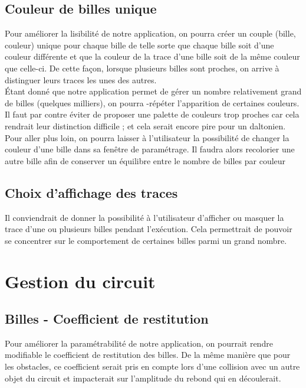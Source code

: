 \documentclass{report}
\begin{document}
\newpage
\subsection{Couleur de billes unique}

Pour améliorer la lisibilité de notre application, on pourra créer un couple (bille, couleur) unique pour chaque bille de telle sorte que chaque bille soit d’une couleur différente et que la couleur de la trace d’une bille soit de la même couleur que celle-ci. De cette façon, lorsque plusieurs billes sont proches, on arrive à distinguer leurs traces les unes des autres. \\

Étant donné que notre application permet de gérer un nombre relativement grand de billes (quelques milliers), on pourra -répéter l’apparition de certaines couleurs. Il faut par contre éviter de proposer une palette de couleurs trop proches car cela rendrait leur distinction difficile ; et cela serait encore pire pour un daltonien. \\

Pour aller plus loin, on pourra laisser à l’utilisateur la possibilité de changer la couleur d’une bille dans sa fenêtre de paramétrage. Il faudra alors recolorier une autre bille afin de conserver un équilibre entre le nombre de billes par couleur


\subsection{Choix d'affichage des traces}

Il conviendrait de donner la possibilité à l’utilisateur d’afficher ou masquer la trace d’une ou plusieurs billes pendant l’exécution. Cela permettrait de pouvoir se concentrer sur le comportement de certaines billes parmi un grand nombre.

\section{Gestion du circuit}

\subsection{Billes - Coefficient de restitution}

Pour améliorer la paramétrabilité de notre application, on pourrait rendre modifiable le coefficient de restitution des billes. De la même manière que pour les obstacles, ce coefficient serait pris en compte lors d’une collision avec un autre objet du circuit et impacterait sur l’amplitude du rebond qui en découlerait.
\end{document}
